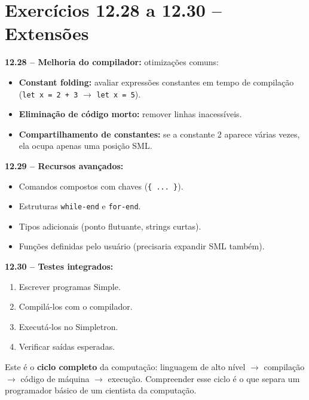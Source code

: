 \documentclass[12pt,a4paper]{article}
\begin{document}
\newpage

\section{Exercícios 12.28 a 12.30 -- Extensões}

\begin{respostabox}
\textbf{12.28 -- Melhoria do compilador:} otimizações comuns:
\begin{itemize}[noitemsep]
  \item \textbf{Constant folding:} avaliar expressões constantes em tempo de
  compilação (\texttt{let x = 2 + 3} $\to$ \texttt{let x = 5}).
  \item \textbf{Eliminação de código morto:} remover linhas inacessíveis.
  \item \textbf{Compartilhamento de constantes:} se a constante 2 aparece várias
  vezes, ela ocupa apenas uma posição SML.
\end{itemize}

\textbf{12.29 -- Recursos avançados:}
\begin{itemize}[noitemsep]
  \item Comandos compostos com chaves (\texttt{\{ ... \}}).
  \item Estruturas \texttt{while-end} e \texttt{for-end}.
  \item Tipos adicionais (ponto flutuante, strings curtas).
  \item Funções definidas pelo usuário (precisaria expandir SML também).
\end{itemize}

\textbf{12.30 -- Testes integrados:}
\begin{enumerate}[noitemsep]
  \item Escrever programas Simple.
  \item Compilá-los com o compilador.
  \item Executá-los no Simpletron.
  \item Verificar saídas esperadas.
\end{enumerate}

Este é o \textbf{ciclo completo} da computação: linguagem de alto nível $\to$
compilação $\to$ código de máquina $\to$ execução. Compreender esse ciclo é o
que separa um programador básico de um cientista da computação.
\end{respostabox}
\end{document}
